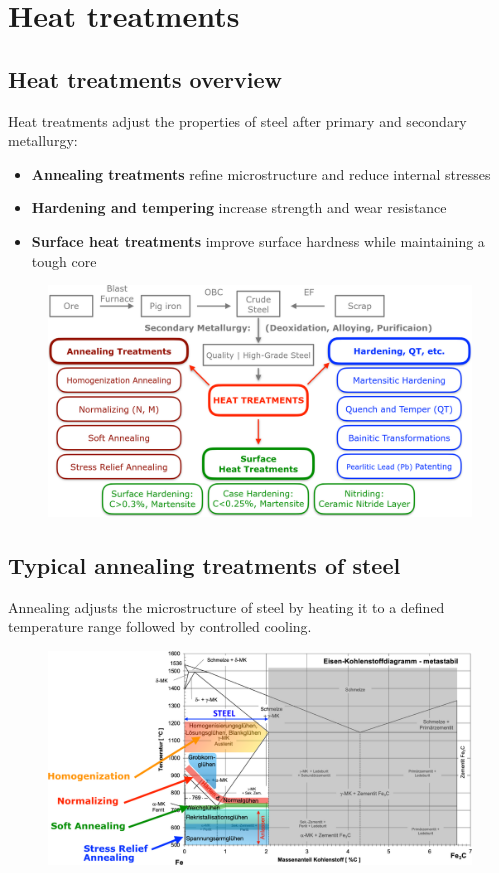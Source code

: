 \documentclass{article}
\begin{document}
\section{Heat treatments}
\subsection{Heat treatments overview}
Heat treatments adjust the properties of steel after primary and secondary metallurgy:
\begin{itemize}
  \item \textbf{Annealing treatments} refine microstructure and reduce internal stresses
  \item \textbf{Hardening and tempering} increase strength and wear resistance
  \item \textbf{Surface heat treatments} improve surface hardness while maintaining a tough core
\end{itemize}

\begin{figure}[ht!]
  \centering
  \includegraphics[width=\textwidth]{media/heat_treatments.png}
\end{figure}

\newpage
\subsection{Typical annealing treatments of steel}
Annealing adjusts the microstructure of steel by heating it to a defined temperature range
followed by controlled cooling.

\begin{figure}[ht!]
  \centering
  \includegraphics[width=\textwidth]{media/annealing_treatments.png}
\end{figure}
\end{document}
